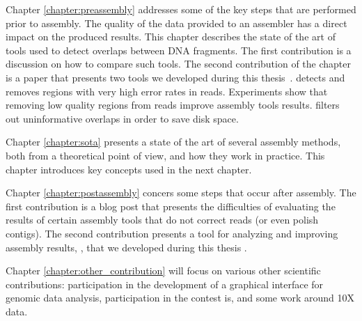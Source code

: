 \documentclass[./main.tex]{subfiles}
\begin{document}
Chapter \ref{chapter:preassembly} addresses some of the key steps that are performed prior to assembly. %
The quality of the data provided to an assembler has a direct impact on the produced results. %
This chapter describes the state of the art of tools used to detect overlaps between DNA fragments. The first contribution is a discussion on how to compare such tools. 
The second contribution of the chapter is a paper that presents two tools we developed during this thesis~\cite{yacrd}.
\yacrd  detects and removes regions with very high error rates in reads.
Experiments show that removing  low quality regions from reads improve assembly tools results. %
\fpa filters out uninformative overlaps in order to save disk space.

Chapter \ref{chapter:sota} presents a state of the art of several assembly methods, both from a theoretical point of view, and how they work in practice. This chapter introduces key concepts used in the next chapter.

Chapter \ref{chapter:postassembly} concers some steps that occur after assembly. The first contribution is a blog post that presents the difficulties of evaluating the results of certain assembly tools that do not correct reads (or even polish contigs). The second contribution presents a tool for analyzing and improving assembly results, \knot, that we developed during this thesis \cite{knot}.

Chapter \ref{chapter:other_contribution} will focus on various other scientific contributions: participation in the development of a graphical interface for genomic data analysis, participation in the contest is, and some work around 10X data.
\end{document}
